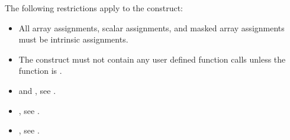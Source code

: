 \begin{fortranspecific}
{}

\begin{samepage}
\restrictions
The following restrictions apply to the  construct:

\begin{itemize}
\item All array assignments, scalar assignments, and masked array assignments must be
intrinsic assignments.

\item The construct must not contain any user defined function calls unless the function is
.
\end{itemize}
\end{samepage}

\crossreferences
\begin{itemize}
\item {} and , see
  .
\item {}, see .
\item {}, see
.
\end{itemize}

\end{fortranspecific}
